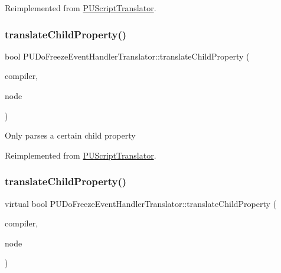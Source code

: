 Reimplemented from \hyperlink{classPUScriptTranslator_ab587d01348ae3e678cb700c719b2b113}{P\+U\+Script\+Translator}.

\mbox{\label{classPUDoFreezeEventHandlerTranslator_ae2b15d82442849e751f12177cdfbab30}} 
\subsubsection{\texorpdfstring{translate\+Child\+Property()}{translateChildProperty()}\hspace{0.1cm}{\footnotesize\ttfamily [1/2]}}
{\footnotesize\ttfamily bool P\+U\+Do\+Freeze\+Event\+Handler\+Translator\+::translate\+Child\+Property (\begin{DoxyParamCaption}\item[{\hyperlink{classPUScriptCompiler}{P\+U\+Script\+Compiler} $\ast$}]{compiler,  }\item[{\hyperlink{classPUAbstractNode}{P\+U\+Abstract\+Node} $\ast$}]{node }\end{DoxyParamCaption})\hspace{0.3cm}{\ttfamily [virtual]}}

Only parses a certain child property 

Reimplemented from \hyperlink{classPUScriptTranslator_a0374d83a8a04e57918975d525e0f8fe8}{P\+U\+Script\+Translator}.

\mbox{\label{classPUDoFreezeEventHandlerTranslator_a18dda240829a088f88a9039f8f2a392c}} 
\subsubsection{\texorpdfstring{translate\+Child\+Property()}{translateChildProperty()}\hspace{0.1cm}{\footnotesize\ttfamily [2/2]}}
{\footnotesize\ttfamily virtual bool P\+U\+Do\+Freeze\+Event\+Handler\+Translator\+::translate\+Child\+Property (\begin{DoxyParamCaption}\item[{\hyperlink{classPUScriptCompiler}{P\+U\+Script\+Compiler} $\ast$}]{compiler,  }\item[{\hyperlink{classPUAbstractNode}{P\+U\+Abstract\+Node} $\ast$}]{node }\end{DoxyParamCaption})\hspace{0.3cm}{\ttfamily [virtual]}}


